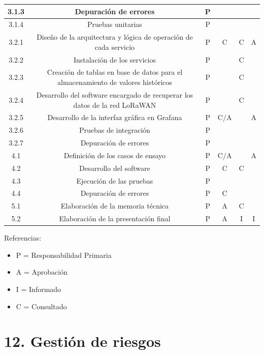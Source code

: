 \documentclass[11pt]{charter}
\begin{document}
\begin{table}[H]
{\begin{tabular}{|c|c|c|c|c|c|}
 3.1.3& Depuración de errores & P &  &  &  \\ \hline
 3.1.4& Pruebas unitarias & P &  &  &  \\ \hline
 3.2.1& Diseño de la arquitectura y lógica de operación de cada servicio & P & C & C & A \\ \hline
 3.2.2& Instalación de los servicios & P &  & C &  \\ \hline
 3.2.3& Creación de tablas en base de datos para el almacenamiento de valores históricos & P &  & C &  \\ \hline
 3.2.4& Desarrollo del software encargado de recuperar los datos de la red LoRaWAN & P &  & C &  \\ \hline
 3.2.5& Desarrollo de la interfaz gráfica en Grafana & P & C/A &  & A \\ \hline
 3.2.6& Pruebas de integración & P &  &  &  \\ \hline
 3.2.7& Depuración de errores & P &  &  &  \\ \hline
 4.1& Definición de los casos de ensayo & P & C/A &  & A \\ \hline
 4.2& Desarrollo del software & P & C & C &  \\ \hline
 4.3& Ejecución de las pruebas & P &  &  &  \\ \hline
 4.4& Depuración de errores & P & C &  &  \\ \hline
 5.1& Elaboración de la memoria técnica & P & A & C &  \\ \hline
 5.2& Elaboración de la presentación final & P & A & I & I \\ \hline
\end{tabular}%
}
\end{table}
{\footnotesize
Referencias:
\begin{itemize}
	\item P = Responsabilidad Primaria
	\item A = Aprobación
	\item I = Informado
	\item C = Consultado
\end{itemize}
} %


\section{12. Gestión de riesgos}
\label{sec:riesgos}
\end{document}
